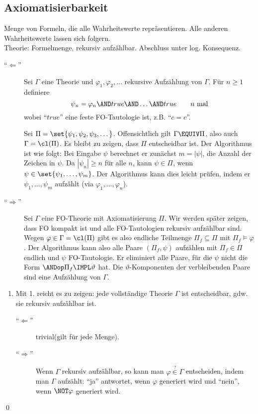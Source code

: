 \subsection{Axiomatisierbarkeit}
Menge von Formeln, die alle Wahrheitswerte repräsentieren. Alle anderen Wahrheitswerte lassen sich folgern.\\
Theorie: Formelmenge, rekursiv aufzählbar. Abschluss unter log. Konsequenz.
\begin{description}
  \item[\enquote{$\Leftarrow$}]
  Sei $\Gamma$ eine Theorie und $\varphi_1, \varphi_2, \ldots$ rekursive
  Aufzählung von $\Gamma$.
  Für $n\geq1$ definiere
  \[
    \psi_n = \varphi_n \AND true \AND \dots \AND true \qquad \text{$n$ mal}
  \]
  wobei \enquote{$true$} eine feste FO-Tautologie ist, z.B. \enquote{$c=c$}.
  
  Sei $\Pi=\set{\psi_1,\psi_2,\psi_3,\dots}$. Offensichtlich gilt
  $\Gamma\EQUIV\Pi$, also auch $\Gamma=\cl(\Pi)$. Es bleibt zu zeigen, dass $\Pi$
  entscheidbar ist. Der Algorithmus ist wie folgt: Bei Eingabe $\psi$
  berechnet er zunächst $m=|\psi|$, die Anzahl der Zeichen in $\psi$. Da
  $|\psi_n| \geq n$ für alle $n$, kann $\psi\in\Pi$, wenn
  $\psi\in\set{\psi_1,\dots,\psi_m}$. Der Algorithmus kann dies leicht prüfen,
  indem er $\psi_1,\dots,\psi_m$ aufzählt (via $\varphi_1,\dots,\varphi_n$).
    
  \item[\enquote{$\Rightarrow$}]
  Sei $\Gamma$ eine FO-Theorie mit Axiomatisierung $\Pi$. Wir werden später
  zeigen, dass FO kompakt ist und alle FO-Tautologien rekursiv aufzählbar
  sind. Wegen $\varphi\in\Gamma=\cl(\Pi)$ gibt es also endliche Teilmenge
  $\Pi_f\subseteq\Pi$ mit $\Pi_f\models\varphi$. Der Algorithmus kann also
  alle Paare $(\Pi_f,\psi)$ aufzählen mit $\Pi_f\in\Pi$ endlich und $\psi$
  FO-Tautologie. Er eliminiert alle Paare, für die $\psi$ nicht die Form
  $\ANDop\Pi_f\IMPL\vartheta$ hat. Die $\vartheta$-Komponenten der verbleibenden Paare
  sind eine Aufzählung von $\Gamma$.
\end{description}

\begin{enumerate}[start=2]%
  \item Mit 1. reicht es zu zeigen: jede vollständige Theorie $\Gamma$
  ist entscheidbar, gdw. sie rekursiv aufzählbar ist.
  
  \begin{description}
    \item[\enquote{$\Leftarrow$}] trivial(gilt für jede Menge).
    \item[\enquote{$\Rightarrow$}]
    Wenn $\Gamma$ rekursiv aufzählbar, so kann man $\varphi\stackrel{?}{\in}\Gamma$
    entscheiden, indem man $\Gamma$ aufzählt: \enquote{ja} antwortet,
    wenn $\varphi$ generiert wird und \enquote{nein}, wenn $\NOT\varphi$
    generiert wird.
  \end{description}
\end{enumerate}
\qed
